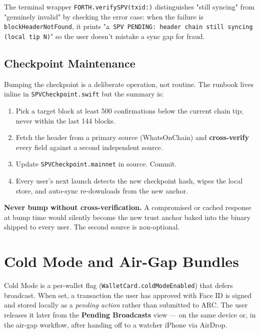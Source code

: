 \documentclass[a4paper, 11pt, openany]{book}
\begin{document}
The terminal wrapper \texttt{FORTH.verifySPV(txid:)} distinguishes "still syncing" from "genuinely invalid" by checking the error case: when the failure is \texttt{block\-Header\-Not\-Found}, it prints "\texttt{$\vartriangle$ SPV PENDING: header chain still syncing (local tip N)}" so the user doesn't mistake a sync gap for fraud.

\subsection{Checkpoint Maintenance}

Bumping the checkpoint is a deliberate operation, not routine. The runbook lives inline in \texttt{SPV\-Check\-point.swift} but the summary is:

\begin{enumerate}
\item Pick a target block at least 500 confirmations below the current chain tip; never within the last 144 blocks.
\item Fetch the header from a primary source (WhatsOnChain) and \textbf{cross-verify} every field against a second independent source.
\item Update \texttt{SPV\-Check\-point.mainnet} in source. Commit.
\item Every user's next launch detects the new checkpoint hash, wipes the local store, and auto-sync re-downloads from the new anchor.
\end{enumerate}

\begin{notebox}
\textbf{Never bump without cross-verification.} A compromised or cached response at bump time would silently become the new trust anchor baked into the binary shipped to every user. The second source is non-optional.
\end{notebox}

\section{Cold Mode and Air-Gap Bundles}

Cold Mode is a per-wallet flag (\texttt{WalletCard.coldModeEnabled}) that defers broadcast. When set, a transaction the user has approved with Face ID is signed and stored locally as a \emph{pending action} rather than submitted to ARC. The user releases it later from the \textbf{Pending Broadcasts} view --- on the same device or, in the air-gap workflow, after handing off to a watcher iPhone via AirDrop.
\end{document}

